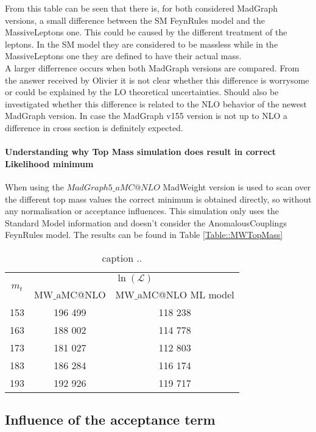 From this table can be seen that there is, for both considered MadGraph versions, a small difference between the SM FeynRules model and the MassiveLeptons one. This could be caused by the different treatment of the leptons. In the SM model they are considered to be massless while in the MassiveLeptons one they are defined to have their actual mass.\\
A larger differrence occurs when both MadGraph versions are compared. From the answer received by Olivier it is not clear whether this difference is worrysome or could be explained by the LO theoretical uncertainties. Should also be investigated whether this difference is related to the NLO behavior of the newest MadGraph version. In case the MadGraph v155 version is not up to NLO a difference in cross section is definitely expected.

\paragraph{Understanding why Top Mass simulation does result in correct Likelihood minimum\\}
When using the $MadGraph5\_aMC@NLO$ MadWeight version is used to scan over the different top mass values the correct minimum is obtained directly, so without any normalisation or acceptance influences. This simulation only uses the Standard Model information and doesn't consider the AnomalousCouplings FeynRules model.
The results can be found in Table \ref{Table::MWTopMass}

\begin{table}[h!]
 \centering
 \begin{tabular}{|c|c|c|}
  \hline
  \multirow{2}{*}{$m_{t}$}	&  \multicolumn{2}{|c|}{$\ln(\mathcal{L})$} \\ 
				& MW$\_$aMC@NLO	& MW$\_$aMC@NLO ML model\\
  \hline
    153 			& 196 499	& 118 238\\
    163				& 188 002	& 114 778\\
    173				& 181 027	& 112 803\\
    183				& 186 284	& 116 174\\
    193				& 192 926	& 119 717\\
  \hline 
 \end{tabular} 
 \caption{ caption ..} \label{table::MGXS}
\end{table}

\subsection{Influence of the acceptance term}

